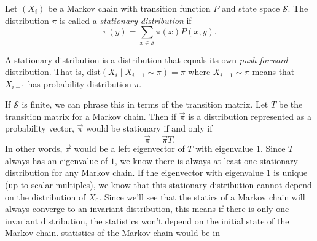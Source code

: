 \documentclass{problemset}
\begin{document}
	\begin{definition}
		Let $(X_i)$ be a Markov chain with transition function $P$ and state space $\mathcal S$.  The distribution $\pi$
		is called a \emph{stationary distribution} if
		\[
			\pi(y) = \sum_{x\in\mathcal S} \pi(x)P(x,y).
		\]
	\end{definition}

	A stationary distribution is a distribution that equals its own \emph{push forward} distribution.
	That is, $\text{dist}(X_i\mid X_{i-1}\sim \pi) = \pi$ where $X_{i-1}\sim \pi$ means that $X_{i-1}$
	has probability distribution $\pi$.

	If $\mathcal S$ is finite, we can phrase this in terms of the transition matrix.  Let $T$ be the transition 
	matrix for a Markov chain.  Then if $\vec \pi$ is a distribution represented as a probability vector,
	$\vec\pi$ would be stationary if and only if
	\[
		\vec \pi = \vec \pi T.
	\]
	In other words, $\vec \pi$ would be a left eigenvector of $T$ with eigenvalue $1$.  Since $T$ always has
	an eigenvalue of $1$, we know there is always at least one stationary distribution for any Markov chain.
	If the eigenvector with eigenvalue $1$ is unique (up to scalar multiples), we know that this
	stationary distribution cannot depend on the distribution of $X_0$.  Since we'll
	see that the statics of a Markov chain will always converge to an invariant
	distribution, this means if there is only one invariant distribution, the statistics won't
	depend on the initial state of the Markov chain.
	statistics of the Markov chain would be in

	
\end{document}

